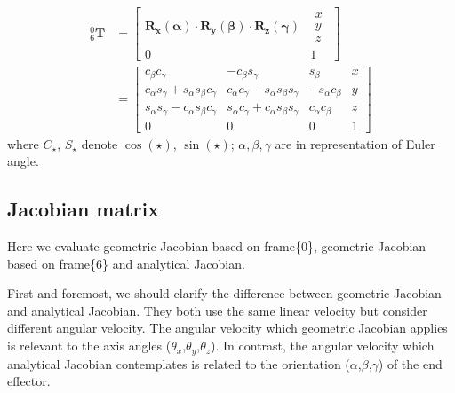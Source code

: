 \begin{equation}
\begin{split}
^0_6\mathbf{T} 
&= 
\begin{bmatrix}
\mathbf{R_x(\alpha ) \cdot R_y(\beta ) \cdot R_z(\gamma )} 
& \begin{matrix}
x\\ 
y\\ 
z
\end{matrix}\\ 
0 & 1
\end{bmatrix}\\
&= 
\begin{bmatrix} 
c_\beta c_\gamma 										& -c_\beta s_\gamma 									& s_\beta 					&x\\ 
c_\alpha s_\gamma +  s_\alpha s_\beta c_\gamma 			& c_\alpha c_\gamma -  s_\alpha s_\beta s_\gamma		& -s_\alpha c_\beta			&y\\ 
s_\alpha s_\gamma -  c_\alpha s_\beta c_\gamma 			& s_\alpha c_\gamma +  c_\alpha s_\beta s_\gamma 		& c_\alpha c_\beta 			&z\\ 
0 														&0 														&0							&1
\end{bmatrix}
\end{split}
\end{equation}
where $C_{\star} $, $ S_{\star}$ denote $\cos \left(\star \right)$, $\sin \left(\star \right)$; $\alpha ,\beta ,\gamma$ are in representation of Euler angle.
\subsection{Jacobian matrix} 
\label{sec:jacobian}
\hspace*{6mm}Here we evaluate geometric Jacobian based on frame\{0\}, geometric Jacobian based on frame\{6\} and analytical Jacobian.
\par
First and foremost, we should clarify the difference between geometric Jacobian and analytical Jacobian. They both use the same linear velocity but consider different angular velocity. The angular velocity which geometric Jacobian applies is relevant to the axis angles ($\theta _x$,$\theta _y$,$\theta _z$). In contrast, the angular velocity which analytical Jacobian contemplates is related to the orientation ($\alpha$,$\beta$,$\gamma$) of the end effector.
